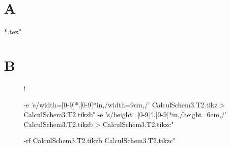 \documentclass{report}
\begin{document}
	
\section{A}
		 *.tex"
\section{B}


\begin{figure}
\centering
\resizebox {12cm} {!} {
	 -e 's/width=[0-9]*.[0-9]*in,/width=9cm,/' CalculSchem3.T2.tikz > CalculSchem3.T2.tikzb"
	 -e 's/height=[0-9]*.[0-9]*in,/height=6cm,/' CalculSchem3.T2.tikzb > CalculSchem3.T2.tikzc"
		
	 -rf CalculSchem3.T2.tikzb CalculSchem3.T2.tikzc"
	}
\end{figure}
\end{document}
